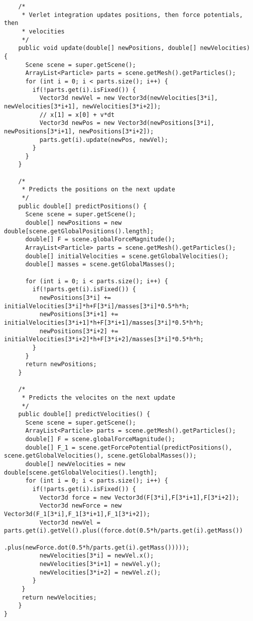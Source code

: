 \begin{lstlisting}
	/*
	 * Verlet integration updates positions, then force potentials, then
	 * velocities
	 */
    public void update(double[] newPositions, double[] newVelocities) {
	  Scene scene = super.getScene();
	  ArrayList<Particle> parts = scene.getMesh().getParticles();
	  for (int i = 0; i < parts.size(); i++) {
	    if(!parts.get(i).isFixed()) {
	  	  Vector3d newVel = new Vector3d(newVelocities[3*i], newVelocities[3*i+1], newVelocities[3*i+2]);
		  // x[1] = x[0] + v*dt
		  Vector3d newPos = new Vector3d(newPositions[3*i], newPositions[3*i+1], newPositions[3*i+2]);
		  parts.get(i).update(newPos, newVel);
	    }
	  }
    }

    /*
	 * Predicts the positions on the next update
	 */
    public double[] predictPositions() {
	  Scene scene = super.getScene();
	  double[] newPositions = new double[scene.getGlobalPositions().length];
	  double[] F = scene.globalForceMagnitude();
	  ArrayList<Particle> parts = scene.getMesh().getParticles();
	  double[] initialVelocities = scene.getGlobalVelocities();
	  double[] masses = scene.getGlobalMasses();

	  for (int i = 0; i < parts.size(); i++) {
		if(!parts.get(i).isFixed()) {
		  newPositions[3*i] += initialVelocities[3*i]*h+F[3*i]/masses[3*i]*0.5*h*h;
		  newPositions[3*i+1] += initialVelocities[3*i+1]*h+F[3*i+1]/masses[3*i]*0.5*h*h;
		  newPositions[3*i+2] += initialVelocities[3*i+2]*h+F[3*i+2]/masses[3*i]*0.5*h*h;
	    }
	  }
	  return newPositions;
    }

    /*
	 * Predicts the velocites on the next update
	 */
    public double[] predictVelocities() {
	  Scene scene = super.getScene();
	  ArrayList<Particle> parts = scene.getMesh().getParticles();
	  double[] F = scene.globalForceMagnitude();
	  double[] F_1 = scene.getForcePotential(predictPositions(), scene.getGlobalVelocities(), scene.getGlobalMasses());
	  double[] newVelocities = new double[scene.getGlobalVelocities().length];
	  for (int i = 0; i < parts.size(); i++) { 
	    if(!parts.get(i).isFixed()) {
		  Vector3d force = new Vector3d(F[3*i],F[3*i+1],F[3*i+2]);
		  Vector3d newForce = new Vector3d(F_1[3*i],F_1[3*i+1],F_1[3*i+2]);
          Vector3d newVel = parts.get(i).getVel().plus((force.dot(0.5*h/parts.get(i).getMass())
							      .plus(newForce.dot(0.5*h/parts.get(i).getMass()))));
		  newVelocities[3*i] = newVel.x();
		  newVelocities[3*i+1] = newVel.y();
		  newVelocities[3*i+2] = newVel.z();
	    }
	 }
	 return newVelocities;
    }
}\end{lstlisting}

